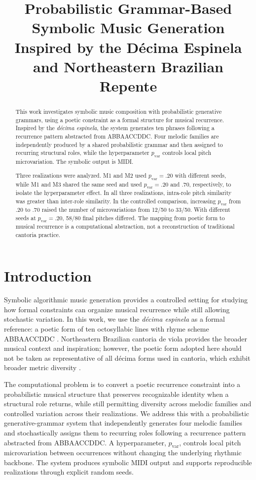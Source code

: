\documentclass{article}
\title{Probabilistic Grammar-Based Symbolic Music Generation Inspired by the D\'ecima Espinela and Northeastern Brazilian Repente}
\begin{document}
\maketitle

\begin{abstract}
This work investigates symbolic music composition with probabilistic generative grammars, using a poetic constraint as a formal structure for musical recurrence. Inspired by the \textit{d\'ecima espinela}, the system generates ten phrases following a recurrence pattern abstracted from ABBAACCDDC. Four melodic families are independently produced by a shared probabilistic grammar and then assigned to recurring structural roles, while the hyperparameter \(p_{\mathrm{var}}\) controls local pitch microvariation. The symbolic output is MIDI.

Three realizations were analyzed. M1 and M2 used \(p_{\mathrm{var}}=.20\) with different seeds, while M1 and M3 shared the same seed and used \(p_{\mathrm{var}}=.20\) and .70, respectively, to isolate the hyperparameter effect. In all three realizations, intra-role pitch similarity was greater than inter-role similarity. In the controlled comparison, increasing \(p_{\mathrm{var}}\) from .20 to .70 raised the number of microvariations from 12/50 to 33/50. With different seeds at \(p_{\mathrm{var}}=.20\), 58/80 final pitches differed. The mapping from poetic form to musical recurrence is a computational abstraction, not a reconstruction of traditional cantoria practice.
\end{abstract}

\section{Introduction}\label{sec:introduction}

Symbolic algorithmic music generation provides a controlled setting for studying how formal constraints can organize musical recurrence while still allowing stochastic variation. In this work, we use the \textit{d\'ecima espinela} as a formal reference: a poetic form of ten octosyllabic lines with rhyme scheme ABBAACCDDC \cite{diazpimienta2021improvisacion}. Northeastern Brazilian cantoria de viola provides the broader musical context and inspiration; however, the poetic form adopted here should not be taken as representative of all d\'ecima forms used in cantoria, which exhibit broader metric diversity \cite{sautchuk2010poetica}.

The computational problem is to convert a poetic recurrence constraint into a probabilistic musical structure that preserves recognizable identity when a structural role returns, while still permitting diversity across melodic families and controlled variation across their realizations. We address this with a probabilistic generative-grammar system that independently generates four melodic families and stochastically assigns them to recurring roles following a recurrence pattern abstracted from ABBAACCDDC. A hyperparameter, \(p_{\mathrm{var}}\), controls local pitch microvariation between occurrences without changing the underlying rhythmic backbone. The system produces symbolic MIDI output and supports reproducible realizations through explicit random seeds.
\end{document}
